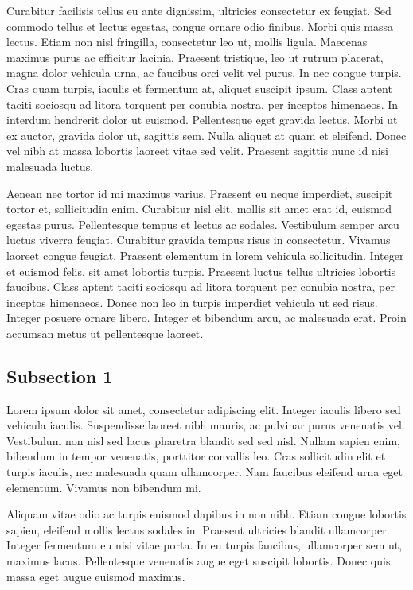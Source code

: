 \documentclass{custom_article}
\begin{document}
Curabitur facilisis tellus eu ante dignissim, ultricies consectetur ex feugiat. Sed commodo tellus et lectus egestas, congue ornare odio finibus. Morbi quis massa lectus. Etiam non nisl fringilla, consectetur leo ut, mollis ligula. Maecenas maximus purus ac efficitur lacinia. Praesent tristique, leo ut rutrum placerat, magna dolor vehicula urna, ac faucibus orci velit vel purus. In nec congue turpis. Cras quam turpis, iaculis et fermentum at, aliquet suscipit ipsum. Class aptent taciti sociosqu ad litora torquent per conubia nostra, per inceptos himenaeos. In interdum hendrerit dolor ut euismod. Pellentesque eget gravida lectus. Morbi ut ex auctor, gravida dolor ut, sagittis sem. Nulla aliquet at quam et eleifend. Donec vel nibh at massa lobortis laoreet vitae sed velit. Praesent sagittis nunc id nisi malesuada luctus.

Aenean nec tortor id mi maximus varius. Praesent eu neque imperdiet, suscipit tortor et, sollicitudin enim. Curabitur nisl elit, mollis sit amet erat id, euismod egestas purus. Pellentesque tempus et lectus ac sodales. Vestibulum semper arcu luctus viverra feugiat. Curabitur gravida tempus risus in consectetur. Vivamus laoreet congue feugiat. Praesent elementum in lorem vehicula sollicitudin. Integer et euismod felis, sit amet lobortis turpis. Praesent luctus tellus ultricies lobortis faucibus. Class aptent taciti sociosqu ad litora torquent per conubia nostra, per inceptos himenaeos. Donec non leo in turpis imperdiet vehicula ut sed risus. Integer posuere ornare libero. Integer et bibendum arcu, ac malesuada erat. Proin accumsan metus ut pellentesque laoreet. 

\subsection{Subsection 1}

Lorem ipsum dolor sit amet, consectetur adipiscing elit. Integer iaculis libero sed vehicula iaculis. Suspendisse laoreet nibh mauris, ac pulvinar purus venenatis vel. Vestibulum non nisl sed lacus pharetra blandit sed sed nisl. Nullam sapien enim, bibendum in tempor venenatis, porttitor convallis leo. Cras sollicitudin elit et turpis iaculis, nec malesuada quam ullamcorper. Nam faucibus eleifend urna eget elementum. Vivamus non bibendum mi.

Aliquam vitae odio ac turpis euismod dapibus in non nibh. Etiam congue lobortis sapien, eleifend mollis lectus sodales in. Praesent ultricies blandit ullamcorper. Integer fermentum eu nisi vitae porta. In eu turpis faucibus, ullamcorper sem ut, maximus lacus. Pellentesque venenatis augue eget suscipit lobortis. Donec quis massa eget augue euismod maximus.
\end{document}
